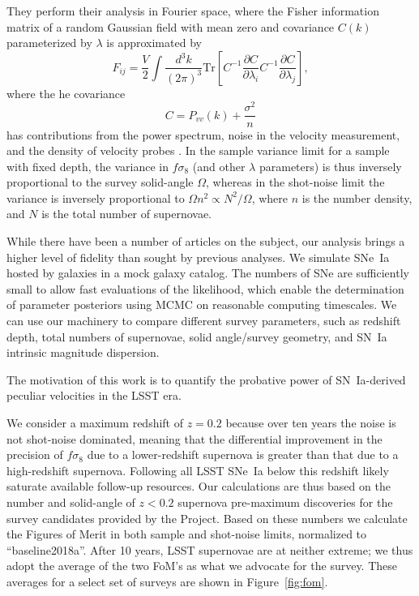 \documentclass{aastex62}   	%
\begin{document}
They perform their analysis in Fourier space, 
where the Fisher information matrix of a random Gaussian field with mean zero and covariance $C(k)$ parameterized by $\lambda$ is
approximated by
\begin{equation}
F_{ij} = \frac{V}{2}\int \frac{d^3k}{(2\pi)^3} \text{Tr}\left[ C^{-1} \frac{\partial C}{\partial \lambda_i} C^{-1}
\frac{\partial C}{\partial \lambda_j} \right],
\end{equation}
where the he covariance
\begin{equation}
C = P_{vv}(k) + \frac{\sigma^2}{n}
\end{equation}
has contributions from the power spectrum, noise in the velocity measurement, and the density of velocity probes
\citep{2017MNRAS.464.2517H}. 
In the sample variance limit for a sample with fixed depth, the variance in $f\sigma_8$ (and other $\lambda$ parameters)
is thus inversely proportional to the survey solid-angle $\Omega$, whereas
in the shot-noise limit the variance is inversely proportional to $\Omega n^2 \propto N^2/\Omega$, where $n$ is the number density,
and $N$ is the total number of supernovae.  

While there have been a number of articles on the subject,
our analysis brings a higher level of fidelity than sought by previous analyses.  We simulate SNe~Ia hosted by galaxies in a mock galaxy
catalog. The numbers of SNe are sufficiently small to allow fast evaluations of the likelihood, which enable the determination of parameter
posteriors using MCMC on reasonable computing timescales.   We can use our machinery to 
compare different survey parameters, such as redshift depth, total numbers of supernovae,
solid angle/survey geometry, and SN~Ia intrinsic magnitude dispersion.

The motivation of this work is to quantify the probative power of SN~Ia-derived peculiar velocities in the LSST era.


We consider a maximum redshift of $z=0.2$ because over ten years the noise is not shot-noise dominated, meaning that the differential improvement
in the precision of
$f\sigma_8$ due to a lower-redshift supernova is greater than that due to a high-redshift supernova.  Following all LSST SNe~Ia below this redshift 
likely saturate available follow-up resources.
Our calculations are thus based on the number and solid-angle of $z<0.2$ supernova pre-maximum discoveries 
for the survey candidates provided by the Project.  Based on these numbers we calculate the Figures of Merit in
both sample and shot-noise limits, normalized to ``baseline2018a''.
After 10 years,
LSST supernovae are at neither extreme; we thus adopt the average of the two FoM's as what we advocate for the survey.
These averages for a select set of surveys are shown in Figure~\ref{fig:fom}.
\end{document}
